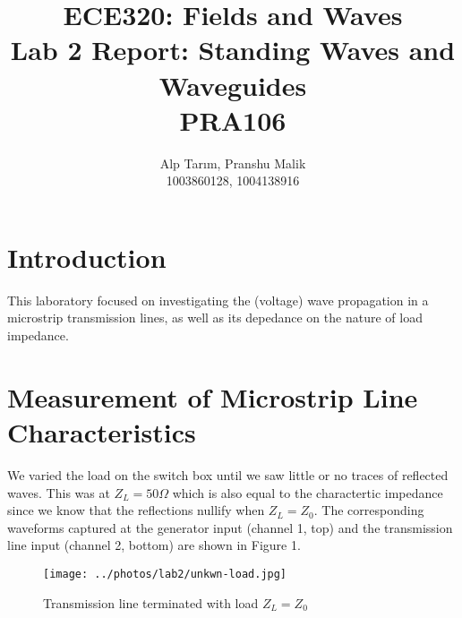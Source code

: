 \documentclass[10pt]{article}
\date{}
\begin{document}
\title{\textbf{\Large{\textsc{ECE320:} Fields and Waves}} \\ \Large{Lab 2 Report: Standing Waves and Waveguides} \\ \textbf{\small{PRA106}}\vspace{-0.3cm}}
\author{Alp Tarım, Pranshu Malik \\ \footnotesize{1003860128}, \footnotesize{1004138916}}

\maketitle

\section{Introduction}

This laboratory focused on investigating the (voltage) wave propagation in a microstrip transmission lines, 
as well as its depedance on the nature of load impedance.

\section{Measurement of Microstrip Line Characteristics}

We varied the load on the switch box until we saw little or no traces of reflected waves.
This was at $Z_L = 50 \Omega$ which is also equal to the charactertic impedance 
since we know that the reflections nullify when $Z_L = Z_0$. The corresponding waveforms
captured at the generator input (channel 1, top) and the transmission line input (channel 2, bottom) 
are shown in Figure 1.

\begin{figure}[h]
    \centering
    \texttt{[image: ../photos/lab2/unkwn-load.jpg]}
    \caption{Transmission line terminated with load $Z_L = Z_0$\vspace{-0.5cm}}
    \label{tline_matching_z_0}
\end{figure}


        
\end{document}
